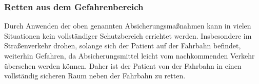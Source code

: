 % 
% 
% 






\subsubsection{Retten aus dem Gefahrenbereich}

Durch Anwenden der oben genannten Absicherungsmaßnahmen kann
in vielen Situationen kein vollständiger Schutzbereich errichtet werden.
Insbesondere im Straßenverkehr drohen, solange sich der Patient auf
der Fahrbahn befindet, weiterhin Gefahren, da Absicherungsmittel leicht
vom nachkommenden Verkehr übersehen werden können. Daher
ist der Patient von der Fahrbahn in einen
vollständig sicheren Raum neben der Fahrbahn zu retten. 


% 
% 
% 
% 
% 




